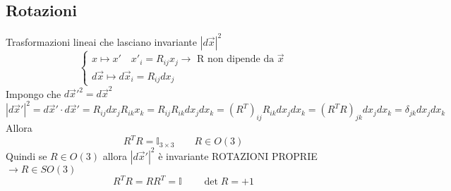 \subsection*{Rotazioni}
Trasformazioni lineai che lasciano invariante ${|d\vec{x}|}^2$
\begin{equation*}
    \begin{cases}
        x \mapsto x' \quad x'_i = R_{ij} x_j \rightarrow \text{ R non dipende da $\vec{x}$} \\
        d\vec{x} \mapsto d\vec{x}_i = R_{ij}dx_j
    \end{cases}
\end{equation*}
Impongo che $d\vec{x}'^2 = d\vec{x}^2$
\begin{equation*}
    {|d\vec{x}'|}^2 = d\vec{x}' \cdot d\vec{x}' = R_{ij} dx_j R_{ik} x_k = R_{ij}R_{ik}dx_jdx_k = {(R^T)}_{ij}R_{ik}dx_jdx_k = {(R^TR)}_{jk}dx_jdx_k = \delta_{jk}dx_jdx_k
\end{equation*}
Allora 
\begin{equation*}
    R^TR = \mathbb{I}_{3\times3} \qquad R \in O(3)
\end{equation*}
Quindi se $R\in O(3)$ allora ${|d\vec{x}'|}^2$ è invariante \newline
ROTAZIONI PROPRIE $\rightarrow R \in SO(3)$
\begin{equation*}
    R^TR = RR^T = \mathbb{I} \qquad \det{R} = +1
\end{equation*}
